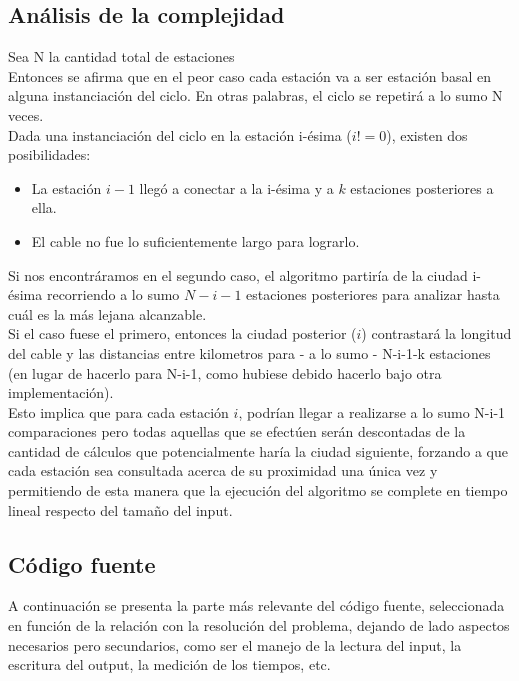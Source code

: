 \newpage
\subsection{An\'alisis de la complejidad}


Sea N la cantidad total de estaciones \\

Entonces se afirma que en el peor caso cada estación va a ser estación basal en alguna instanciación del ciclo. En otras palabras, el ciclo se repetirá a lo sumo N veces.\\

Dada una instanciación del ciclo en la estación i-ésima ($i != 0$), existen dos posibilidades:
\begin{itemize}
\item	La estación $i-1$ llegó a conectar a la i-ésima y a $k$ estaciones posteriores a ella.
\item	El cable no fue lo suficientemente largo para lograrlo.
\end{itemize}

Si nos encontráramos en el segundo caso, el algoritmo partiría de la ciudad i-ésima recorriendo a lo sumo $N-i-1$ estaciones posteriores para analizar hasta cuál es la más lejana alcanzable.\\
Si el caso fuese el primero, entonces la ciudad posterior ($i$) contrastará la longitud del cable y las distancias entre kilometros para - a lo sumo - N-i-1-k estaciones (en lugar de hacerlo para N-i-1, como hubiese debido hacerlo bajo otra implementación).\\

Esto implica que para cada estación $i$, podrían llegar a realizarse a lo sumo N-i-1 comparaciones pero todas aquellas que se efectúen serán descontadas de la cantidad de cálculos que potencialmente haría la ciudad siguiente, forzando a que cada estación sea consultada acerca de su proximidad una única vez y permitiendo de esta manera que la ejecución del algoritmo se complete en tiempo lineal respecto del tamaño del input.\\ 

\newpage
\subsection{C\'odigo fuente}

A continuación se presenta la parte más relevante del código fuente, seleccionada en función de la relación con la resolución del problema, dejando de lado aspectos necesarios pero secundarios, como ser el manejo de la lectura del input, la escritura del output, 
la medición de los tiempos, etc.

